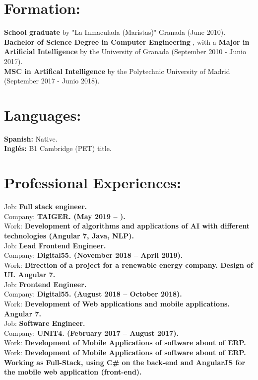 \documentclass	[10pt,a4paper,oneside]{article}
\newcommand{\seccion}[1]{\vspace*{3mm}\section*{#1}\vspace*{-3mm}}
\begin{document}
\seccion{Formation:}
\textbf{School graduate} by "La Inmaculada (Maristas)" Granada (June 2010).\\
\textbf{Bachelor of Science Degree in Computer Engineering} , with a \textbf{Major in Artificial Intelligence} by the University of Granada (September 2010 - Junio 2017).\\
\textbf{MSC in Artifical Intelligence} by the Polytechnic University of Madrid (September 2017 - Junio 2018).\\

\seccion{Languages:}
\textbf{Spanish:} Native.\\
\textbf{Inglés:} B1 Cambridge (PET) title.\\


\seccion{Professional Experiences:}

Job: \textbf{Full stack engineer.}\\
Company: \textbf{TAIGER. (May 2019 –  ).}\\
Work: \textbf{Development of algorithms and applications of AI with different technologies (Angular 7, Java, NLP).}\\

Job: \textbf{Lead Frontend Engineer.}\\
Company: \textbf{Digital55. (November 2018 – April 2019).}\\
Work: \textbf{Direction of a project for a renewable energy company. Design of UI. Angular 7.}\\

Job: \textbf{Frontend Engineer.}\\
Company: \textbf{Digital55. (August 2018 – October 2018).}\\
Work: \textbf{Development of Web applications and mobile applications. Angular 7.}\\

Job: \textbf{Software Engineer.}\\
Company: \textbf{UNIT4. (February 2017 – August 2017).}\\
Work: \textbf{Development of Mobile Applications of software about of ERP.}\\
Work: \textbf{Development of Mobile Applications of software about of ERP. Working as Full-Stack, using C\# on the back-end and AngularJS for the mobile web application (front-end).}\\
\end{document}
